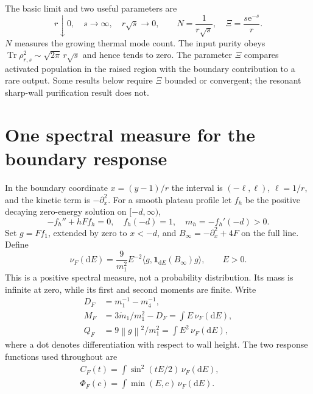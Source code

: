 \documentclass[aps,pra,reprint,superscriptaddress,longbibliography]{revtex4-2}
\newcommand{\Tr}{\operatorname{Tr}}
\newcommand{\dd}{\mathrm d}
\newcommand{\ee}{\mathrm e}
\newcommand{\norm}[1]{\left\lVert#1\right\rVert}
\newcommand{\ip}[2]{\langle#1,#2\rangle}
\newcommand{\one}{\mathbf 1}
\begin{document}
The basic limit and two useful parameters are
\begin{equation}
 r\downarrow0,\quad s\to\infty,\quad r\sqrt{s}\to0,
 \qquad N=\frac1{r\sqrt{s}},\quad \Xi=\frac{s\ee^{-s}}r.
                                                               \label{eq:regime}
\end{equation}
$N$ measures the growing thermal mode count. The input purity obeys
$\Tr\rho_{r,s}^2\sim\sqrt{2\pi}\,r\sqrt{s}$ and hence tends to zero.
The parameter $\Xi$ compares activated population in the raised region
with the boundary contribution to a rare output. Some results below
require $\Xi$ bounded or convergent; the resonant sharp-wall
purification result does not.

\section{One spectral measure for the boundary response}
\label{sec:source}

In the boundary coordinate $x=(y-1)/r$ the interval is
$(-\ell,\ell)$, $\ell=1/r$, and the kinetic term is $-\partial_x^2$.
For a smooth plateau profile let $f_h$ be the positive decaying
zero-energy solution on $[-d,\infty)$,
\begin{equation}
 -f_h''+hFf_h=0,\quad f_h(-d)=1,\quad m_h=-f_h'(-d)>0.
                                                               \label{eq:zeroenergy}
\end{equation}
Set $g=Ff_1$, extended by zero to $x<-d$, and
$B_\infty=-\partial_x^2+4F$ on the full line. Define
\begin{equation}
 \nu_F(\dd E)=\frac9{m_1^2}E^{-2}
       \ip{g}{\one_{\dd E}(B_\infty)g},\qquad E>0.
                                                               \label{eq:source}
\end{equation}
This is a positive spectral measure, not a probability distribution.
Its mass is infinite at zero, while its first and second moments are
finite. Write
\begin{align}
 D_F&=m_1^{-1}-m_4^{-1},\nonumber\\
 M_F&=3\dot m_1/m_1^2-D_F=\int E\,\nu_F(\dd E),\label{eq:moments}\\
 Q_F&=9\norm{g}^2/m_1^2=\int E^2\,\nu_F(\dd E),\nonumber
\end{align}
where a dot denotes differentiation with respect to wall height.
The two response functions used throughout are
\begin{equation}
 \begin{gathered}
 C_F(t)=\int\sin^2(tE/2)\,\nu_F(\dd E),\qquad\\
 \Phi_F(c)=\int\min(E,c)\,\nu_F(\dd E).          \label{eq:responses}
 \end{gathered}
\end{equation}
\end{document}
